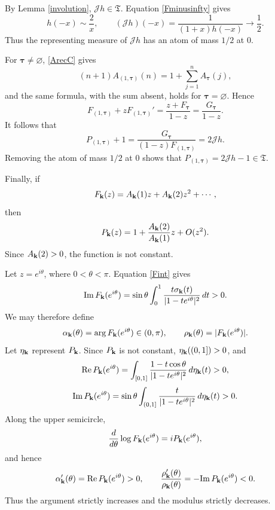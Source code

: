 \documentclass[12pt,a4paper]{amsart}
\makeatletter
\numberwithin{equation}{section}
\renewenvironment{proof}[1][Proof]{%
  \par\pushQED{\qed}%
  \normalfont\topsep6\p@\@plus6\p@\relax
  \trivlist
  \item[\hskip\labelsep\bfseries #1:]\ignorespaces
}{%
  \popQED\endtrivlist\@endpefalse
}
\theoremstyle{plain}
\theoremstyle{definition}
\makeatother
\begin{document}
\begin{proof}
By Lemma \ref{involution}, $\mathcal{J}h\in\mathfrak{T}$.  Equation \eqref{Fminusinfty} gives
\[
h(-x)\sim\frac2x,
\qquad
(\mathcal{J}h)(-x)=\frac1{(1+x)h(-x)}\rightarrow\frac12.
\]
Thus the representing measure of $\mathcal{J}h$ has an atom of mass $1/2$ at $0$.

For ${\boldsymbol\tau}\neq\varnothing$, \eqref{ArecC} gives
\[
(n+1)A_{(1,{\boldsymbol\tau})}(n)
=1+\sum_{j=1}^{n}A_{\boldsymbol\tau}(j),
\]
and the same formula, with the sum absent, holds for
${\boldsymbol\tau}=\varnothing$.  Hence
\begin{equation}\label{firstoneidentity}
F_{(1,{\boldsymbol\tau})}+zF_{(1,{\boldsymbol\tau})}'
=\frac{z+F_{\boldsymbol\tau}}{1-z}
=\frac{G_{\boldsymbol\tau}}{1-z}.
\end{equation}
It follows that
\[
P_{(1,{\boldsymbol\tau})}+1
=\frac{G_{\boldsymbol\tau}}{(1-z)F_{(1,{\boldsymbol\tau})}}
=2\mathcal{J}h.
\]
Removing the atom of mass $1/2$ at $0$ shows that
$P_{(1,{\boldsymbol\tau})}=2\mathcal{J}h-1\in\mathfrak{T}$.

Finally, if
\[
F_{\bf k}(z)=A_{\bf k}(1)z+A_{\bf k}(2)z^2+\cdots,
\]
then
\[
P_{\bf k}(z)=1+\frac{A_{\bf k}(2)}{A_{\bf k}(1)}z+O(z^2).
\]
Since $A_{\bf k}(2)>0$, the function is not constant.
\end{proof}

Let $z=e^{i\theta}$, where $0<\theta<\pi$.  Equation \eqref{Fint} gives
\begin{equation}\label{ImFpositive}
\mathrm{Im}\,F_{\bf k}(e^{i\theta})
=\sin\theta\int_0^1
\frac{t\sigma_{\bf k}(t)}{|1-te^{i\theta}|^2}\,dt>0.
\end{equation}
We may therefore define
\[
\alpha_{\bf k}(\theta)=\arg F_{\bf k}(e^{i\theta})\in(0,\pi),
\qquad
\rho_{\bf k}(\theta)=|F_{\bf k}(e^{i\theta})|.
\]
Let $\eta_{\bf k}$ represent $P_{\bf k}$.  Since $P_{\bf k}$ is not constant,
$\eta_{\bf k}((0,1])>0$, and
\[
\mathrm{Re}\,P_{\bf k}(e^{i\theta})
=\int_{[0,1]}
\frac{1-t\cos\theta}{|1-te^{i\theta}|^2}\,d\eta_{\bf k}(t)>0,
\]
\[
\mathrm{Im}\,P_{\bf k}(e^{i\theta})
=\sin\theta\int_{(0,1]}
\frac{t}{|1-te^{i\theta}|^2}\,d\eta_{\bf k}(t)>0.
\]
Along the upper semicircle,
\[
\frac{d}{d\theta}\log F_{\bf k}(e^{i\theta})
=iP_{\bf k}(e^{i\theta}),
\]
and hence
\begin{equation}\label{selfmonotonicity}
\alpha_{\bf k}'(\theta)=\mathrm{Re}\,P_{\bf k}(e^{i\theta})>0,
\qquad
\frac{\rho_{\bf k}'(\theta)}{\rho_{\bf k}(\theta)}
=-\mathrm{Im}\,P_{\bf k}(e^{i\theta})<0.
\end{equation}
Thus the argument strictly increases and the modulus strictly decreases.
\end{document}
